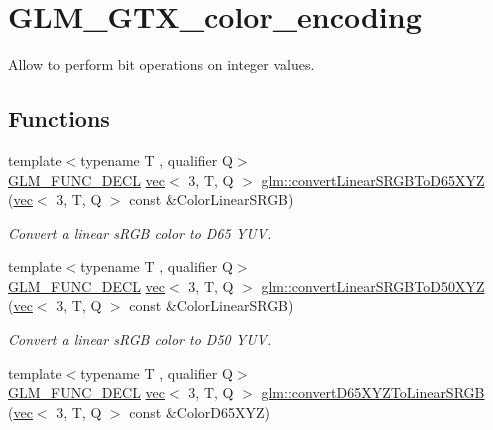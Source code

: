 \hypertarget{group__gtx__color__encoding}{}\section{G\+L\+M\+\_\+\+G\+T\+X\+\_\+color\+\_\+encoding}
\label{group__gtx__color__encoding}


Allow to perform bit operations on integer values.  


\subsection*{Functions}
\begin{DoxyCompactItemize}
\item 
{\footnotesize template$<$typename T , qualifier Q$>$ }\\\mbox{\hyperlink{setup_8hpp_ab2d052de21a70539923e9bcbf6e83a51}{G\+L\+M\+\_\+\+F\+U\+N\+C\+\_\+\+D\+E\+CL}} \mbox{\hyperlink{structglm_1_1vec}{vec}}$<$ 3, T, Q $>$ \mbox{\hyperlink{group__gtx__color__encoding_gaf9e130d9d4ccf51cc99317de7449f369}{glm\+::convert\+Linear\+S\+R\+G\+B\+To\+D65\+X\+YZ}} (\mbox{\hyperlink{structglm_1_1vec}{vec}}$<$ 3, T, Q $>$ const \&Color\+Linear\+S\+R\+GB)
\begin{DoxyCompactList}\small\item\em Convert a linear s\+R\+GB color to D65 Y\+UV. \end{DoxyCompactList}\item 
{\footnotesize template$<$typename T , qualifier Q$>$ }\\\mbox{\hyperlink{setup_8hpp_ab2d052de21a70539923e9bcbf6e83a51}{G\+L\+M\+\_\+\+F\+U\+N\+C\+\_\+\+D\+E\+CL}} \mbox{\hyperlink{structglm_1_1vec}{vec}}$<$ 3, T, Q $>$ \mbox{\hyperlink{group__gtx__color__encoding_ga1522ba180e3d83d554a734056da031f9}{glm\+::convert\+Linear\+S\+R\+G\+B\+To\+D50\+X\+YZ}} (\mbox{\hyperlink{structglm_1_1vec}{vec}}$<$ 3, T, Q $>$ const \&Color\+Linear\+S\+R\+GB)
\begin{DoxyCompactList}\small\item\em Convert a linear s\+R\+GB color to D50 Y\+UV. \end{DoxyCompactList}\item 
{\footnotesize template$<$typename T , qualifier Q$>$ }\\\mbox{\hyperlink{setup_8hpp_ab2d052de21a70539923e9bcbf6e83a51}{G\+L\+M\+\_\+\+F\+U\+N\+C\+\_\+\+D\+E\+CL}} \mbox{\hyperlink{structglm_1_1vec}{vec}}$<$ 3, T, Q $>$ \mbox{\hyperlink{group__gtx__color__encoding_ga5265386fc3ac29e4c580d37ed470859c}{glm\+::convert\+D65\+X\+Y\+Z\+To\+Linear\+S\+R\+GB}} (\mbox{\hyperlink{structglm_1_1vec}{vec}}$<$ 3, T, Q $>$ const \&Color\+D65\+X\+YZ)

\end{DoxyCompactItemize}
